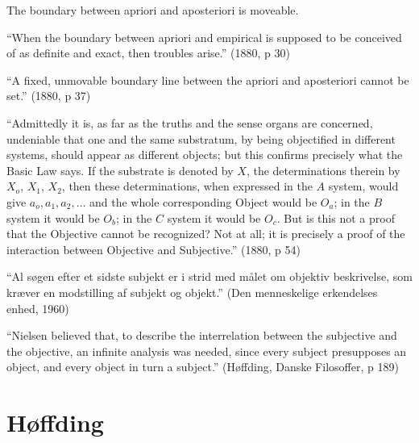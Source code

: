 \documentclass[ignorenonframetext, ]{beamer}
\begin{document}
\begin{frame}

  The boundary between apriori and aposteriori is moveable.

  \vfill 

  ``When the boundary between apriori and empirical is supposed to be
  conceived of as definite and exact, then troubles arise.'' (1880, p
  30)


  \vfill ``A fixed, unmovable boundary line between the apriori and
  aposteriori cannot be set.'' (1880, p 37)

\end{frame}


\begin{frame}

  
  ``Admittedly it is, as far as the truths and the sense organs are
  concerned, undeniable that one and the same substratum, by being
  objectified in different systems, should appear as different
  objects; but this confirms precisely what the Basic Law says. If the
  substrate is denoted by $X$, the determinations therein by $X_o$,
  $X_1$, $X_2$, then these determinations, when expressed in the $A$
  system, would give $a_o,a_1,a_2,\dots $ and the whole corresponding
  Object would be $O_a$; in the $B$ system it would be $O_b$; in the
  $C$ system it would be $O_c$. But is this not a proof that the
  Objective cannot be recognized?  Not at all; it is precisely a proof
  of the interaction between Objective and Subjective.'' (1880, p 54)

\end{frame}


\begin{frame}

  ``Al søgen efter et sidste subjekt er i strid med målet om objektiv
  beskrivelse, som kræver en modstilling af subjekt og objekt.''
  \newline (Den menneskelige erkendelses enhed, 1960)

  \vfill ``Nielsen believed that, to describe the interrelation
  between the subjective and the objective, an infinite analysis was
  needed, since every subject presupposes an object, and every object
  in turn a subject.''  \newline (Høffding, Danske Filosoffer, p 189)

\end{frame}



\section{Høffding}
\end{document}
